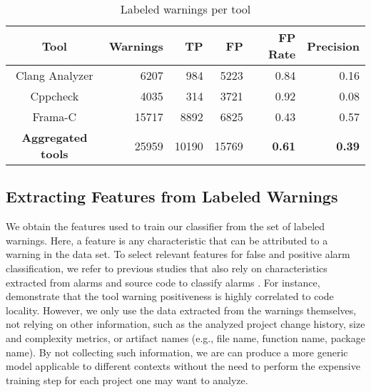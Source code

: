   \begin{table}
    \begin{center}
        \begin{tabular}{crrrrr}\hline
          Tool & Warnings & TP & FP & FP Rate & Precision \\
        \hline
          Clang Analyzer & 6207 & 984 & 5223 & 0.84 & 0.16 \\
          Cppcheck & 4035 & 314 & 3721 & 0.92 & 0.08 \\
          Frama-C & 15717 & 8892 & 6825 & 0.43 & 0.57 \\
          \textbf{Aggregated tools} & 25959 & 10190 & 15769 & \textbf{0.61}  & \textbf{0.39} \\ \hline
        \end{tabular}
        \caption{Labeled warnings per tool}\label{tab:labeled_warnings}
    \end{center}
\end{table}


\subsection{Extracting Features from Labeled Warnings}\label{sec:data:features}


We obtain the features used to train our classifier from the set of labeled
warnings. Here, a feature is any characteristic that can be attributed to a
warning in the data set. To select relevant features for false and positive
alarm classification, we refer to previous studies that also rely on
characteristics extracted from alarms and source code to classify alarms
\citep{ruthruff_predicting_2008, kremenek2004correlation, heckman2009model,
jung2005taming}. For instance, \cite{kremenek2004correlation}
demonstrate that the tool warning positiveness is highly correlated to code
locality.  However, we only use the data extracted from the warnings
themselves, not relying on other information, such as the analyzed project
change history, size and complexity metrics, or artifact names (e.g., file name,
function name, package name). By not collecting such information, we are can
produce a more generic model applicable to different contexts without the
need to perform the expensive training step for each project one may want to
analyze.

